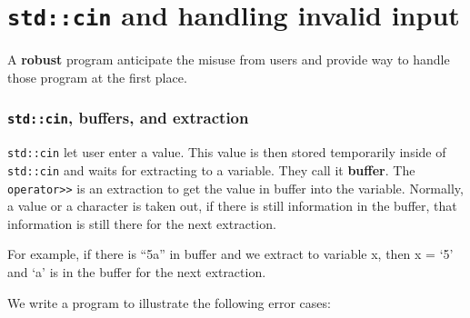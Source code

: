 \documentclass[
  letterpaper,
  DIV=11,
  numbers=noendperiod]{scrreprt}
\begin{document}
\hypertarget{stdcin-and-handling-invalid-input}{%
\section{\texorpdfstring{\texttt{std::cin} and handling invalid
input}{std::cin and handling invalid input}}\label{stdcin-and-handling-invalid-input}}

A \textbf{robust} program anticipate the misuse from users and provide
way to handle those program at the first place.

\hypertarget{stdcin-buffers-and-extraction}{%
\subsubsection{\texorpdfstring{\texttt{std::cin}, buffers, and
extraction}{std::cin, buffers, and extraction}}\label{stdcin-buffers-and-extraction}}

\texttt{std::cin} let user enter a value. This value is then stored
temporarily inside of \texttt{std::cin} and waits for extracting to a
variable. They call it \textbf{buffer}. The
\texttt{operator\textgreater{}\textgreater{}} is an extraction to get
the value in buffer into the variable. Normally, a value or a character
is taken out, if there is still information in the buffer, that
information is still there for the next extraction.

For example, if there is ``5a'' in buffer and we extract to variable x,
then x = `5' and `a' is in the buffer for the next extraction.

We write a program to illustrate the following error cases:
\end{document}
